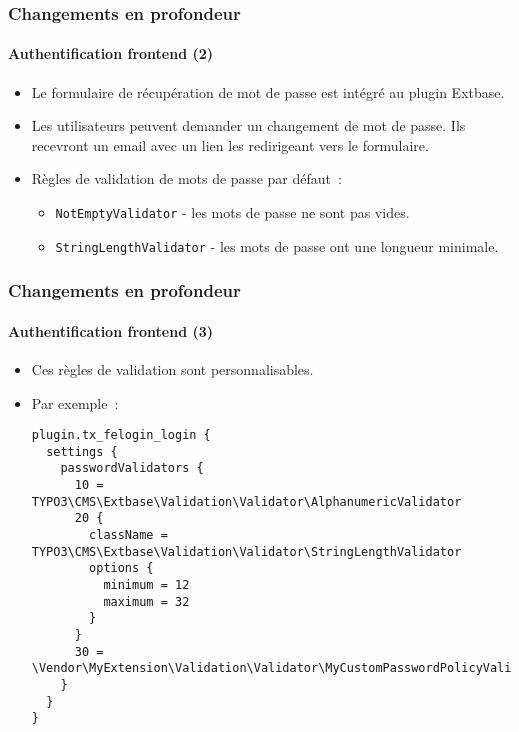 
\begin{frame}[fragile]
	\frametitle{Changements en profondeur}
	\framesubtitle{Authentification frontend (2)}

	\begin{itemize}

		\item Le formulaire de récupération de mot de passe est intégré au plugin Extbase.
		\item Les utilisateurs peuvent demander un changement de mot de passe. Ils recevront
			un email avec un lien les redirigeant vers le formulaire.
		\item Règles de validation de mots de passe par défaut~:

			\begin{itemize}
				\item \texttt{NotEmptyValidator} - les mots de passe ne sont pas vides.
				\item \texttt{StringLengthValidator} - les mots de passe ont une longueur minimale.
			\end{itemize}

	\end{itemize}

\end{frame}


\begin{frame}[fragile]
	\frametitle{Changements en profondeur}
	\framesubtitle{Authentification frontend (3)}

	\lstset{basicstyle=\tiny\ttfamily}

	\begin{itemize}
		\item Ces règles de validation sont personnalisables.
		\item Par exemple~:
\begin{lstlisting}
plugin.tx_felogin_login {
  settings {
    passwordValidators {
      10 = TYPO3\CMS\Extbase\Validation\Validator\AlphanumericValidator
      20 {
        className = TYPO3\CMS\Extbase\Validation\Validator\StringLengthValidator
        options {
          minimum = 12
          maximum = 32
        }
      }
      30 = \Vendor\MyExtension\Validation\Validator\MyCustomPasswordPolicyValidator
    }
  }
}
\end{lstlisting}

	\end{itemize}

\end{frame}


